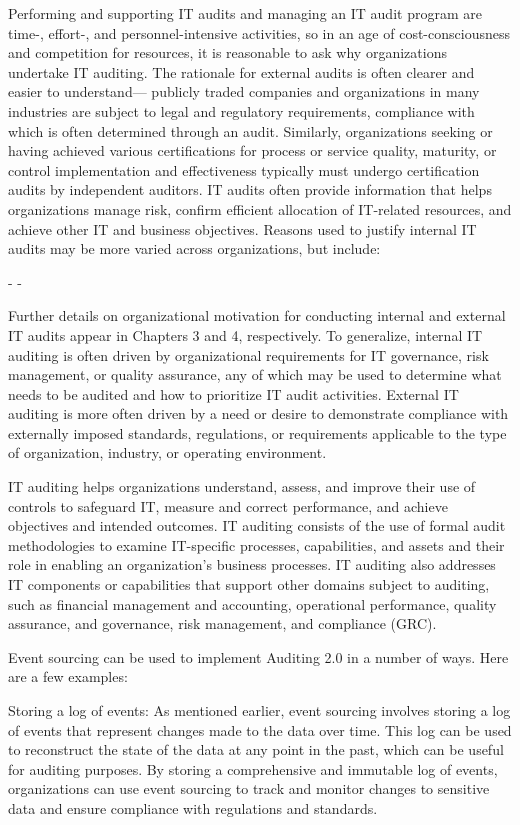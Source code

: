 Performing and supporting IT audits and managing an IT audit program are time-,
effort-, and personnel-intensive activities, so in an age of cost-consciousness and
competition for resources, it is reasonable to ask why organizations undertake IT
auditing. The rationale for external audits is often clearer and easier to understand—
publicly traded companies and organizations in many industries are subject to legal
and regulatory requirements, compliance with which is often determined through an
audit. Similarly, organizations seeking or having achieved various certifications for
process or service quality, maturity, or control implementation and effectiveness typically must undergo certification audits by independent auditors. IT audits often provide information that helps organizations manage risk, confirm efficient allocation of
IT-related resources, and achieve other IT and business objectives. Reasons used to
justify internal IT audits may be more varied across organizations, but include:

- 
- 

Further details on organizational motivation for conducting internal and external IT audits appear in Chapters  3 and 4, respectively. To generalize, internal IT
auditing is often driven by organizational requirements for IT governance, risk
management, or quality assurance, any of which may be used to determine what
needs to be audited and how to prioritize IT audit activities. External IT auditing
is more often driven by a need or desire to demonstrate compliance with externally
imposed standards, regulations, or requirements applicable to the type of organization, industry, or operating environment.

IT auditing helps organizations understand, assess, and improve
their use of controls to safeguard IT, measure and correct performance, and achieve
objectives and intended outcomes. IT auditing consists of the use of formal audit
methodologies to examine IT-specific processes, capabilities, and assets and their
role in enabling an organization’s business processes. IT auditing also addresses IT
components or capabilities that support other domains subject to auditing, such as
financial management and accounting, operational performance, quality assurance,
and governance, risk management, and compliance (GRC).


Event sourcing can be used to implement Auditing 2.0 in a number of ways. Here are a few examples:

Storing a log of events: As mentioned earlier, event sourcing involves storing a log of events that represent changes made to the data over time. This log can be used to reconstruct the state of the data at any point in the past, which can be useful for auditing purposes. By storing a comprehensive and immutable log of events, organizations can use event sourcing to track and monitor changes to sensitive data and ensure compliance with regulations and standards.

